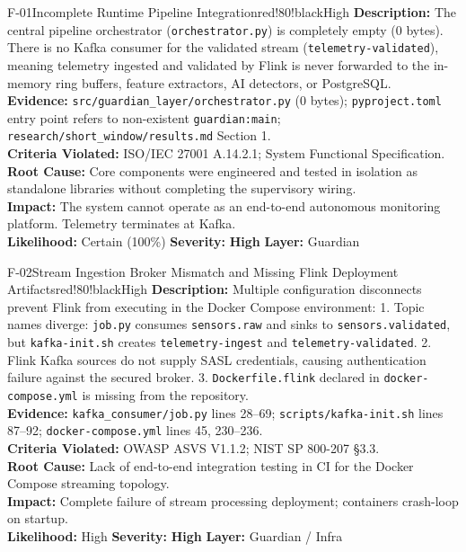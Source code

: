 \documentclass[10pt,a4paper]{report}
\begin{document}
\begin{findingbox}{F-01}{Incomplete Runtime Pipeline Integration}{red!80!black}{High}
\textbf{Description:} The central pipeline orchestrator (\texttt{orchestrator.py}) is completely empty (0 bytes). There is no Kafka consumer for the validated stream (\texttt{telemetry-validated}), meaning telemetry ingested and validated by Flink is never forwarded to the in-memory ring buffers, feature extractors, AI detectors, or PostgreSQL.\\
\textbf{Evidence:} \texttt{src/guardian\_layer/orchestrator.py} (0 bytes); \texttt{pyproject.toml} entry point refers to non-existent \texttt{guardian:main}; \texttt{research/short\_window/results.md} Section 1.\\
\textbf{Criteria Violated:} ISO/IEC 27001 A.14.2.1; System Functional Specification.\\
\textbf{Root Cause:} Core components were engineered and tested in isolation as standalone libraries without completing the supervisory wiring.\\
\textbf{Impact:} The system cannot operate as an end-to-end autonomous monitoring platform. Telemetry terminates at Kafka.\\
\textbf{Likelihood:} Certain (100\%) \quad \textbar \quad \textbf{Severity:} \textbf{High} \quad \textbar \quad \textbf{Layer:} Guardian
\end{findingbox}

\begin{findingbox}{F-02}{Stream Ingestion Broker Mismatch and Missing Flink Deployment Artifacts}{red!80!black}{High}
\textbf{Description:} Multiple configuration disconnects prevent Flink from executing in the Docker Compose environment:
1. Topic names diverge: \texttt{job.py} consumes \texttt{sensors.raw} and sinks to \texttt{sensors.validated}, but \texttt{kafka-init.sh} creates \texttt{telemetry-ingest} and \texttt{telemetry-validated}.
2. Flink Kafka sources do not supply SASL credentials, causing authentication failure against the secured broker.
3. \texttt{Dockerfile.flink} declared in \texttt{docker-compose.yml} is missing from the repository.\\
\textbf{Evidence:} \texttt{kafka\_consumer/job.py} lines 28--69; \texttt{scripts/kafka-init.sh} lines 87--92; \texttt{docker-compose.yml} lines 45, 230--236.\\
\textbf{Criteria Violated:} OWASP ASVS V1.1.2; NIST SP 800-207 §3.3.\\
\textbf{Root Cause:} Lack of end-to-end integration testing in CI for the Docker Compose streaming topology.\\
\textbf{Impact:} Complete failure of stream processing deployment; containers crash-loop on startup.\\
\textbf{Likelihood:} High \quad \textbar \quad \textbf{Severity:} \textbf{High} \quad \textbar \quad \textbf{Layer:} Guardian / Infra
\end{findingbox}
\end{document}
